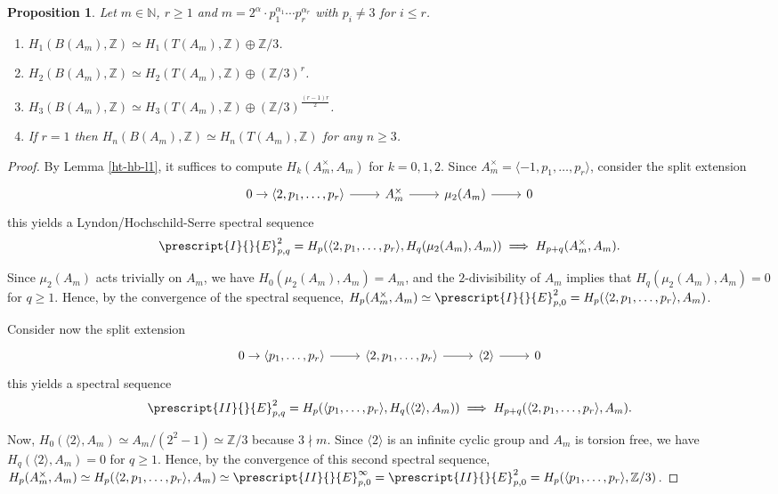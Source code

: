 \documentclass[11pt]{amsart}
\theoremstyle{definition}
\theoremstyle{plain}
\newtheorem{prp}[ntn]{Proposition}
\numberwithin{equation}{section}
\newcommand{\N}{\mathbb{N}}
\newcommand{\z}{\mathbb{Z}}
\newcommand{\lan}{\langle}
\newcommand{\ran}{\rangle}
\begin{document}
\begin{prp}\label{prp-hb-ht-am}
    Let $m\in\N$, $r\geq 1$ and $m=2^\alpha\cdot p_1^{\alpha_1}\cdots p_r^{\alpha_r}$ with $p_i\neq 3$ for $i\leq r$.
    \begin{enumerate}
        \item $H_1(B(A_m),\z)\simeq H_1(T(A_m),\z)\oplus \z/3$.
        \item $H_2(B(A_m),\z)\simeq H_2(T(A_m),\z)\oplus(\z/3)^r$.
        \item $H_3(B(A_m),\z)\simeq H_3(T(A_m),\z)\oplus(\z/3)^{\frac{(r-1)r}{2}}$.
        \item If $r=1$ then $H_n(B(A_m),\z)\simeq H_n(T(A_m),\z)$ for any $n\geq 3$.
    \end{enumerate}
\end{prp}
\begin{proof}
    By Lemma \ref{ht-hb-l1}, it suffices to compute $H_{k}(A_m^\times,A_m)$ for $k=0,1,2$. Since $A_m^\times=\lan-1,p_1,\dots,p_r\ran$, consider the split extension
    \[
        \begin{tikzcd}
            0\to \lan 2,p_1,\dots,p_r\ran\ar[r] & A_m^\times \ar[r] & \mu_2(A_m)\ar[r] & 0 
        \end{tikzcd}
    \]
    this yields a Lyndon/Hochschild-Serre spectral sequence
    \[
        \prescript{I}{}{E}^2_{p,q}=H_p(\lan 2,p_1,\dots,p_r\ran,H_q(\mu_2(A_m),A_m))\implies H_{p+q}(A_m^\times,A_m).
    \]
    
    Since $\mu_2(A_m)$ acts trivially on $A_m$, we have $H_0(\mu_2(A_m),A_m)=A_m$, and the $2$-divisibility of $A_m$ implies that $H_q(\mu_2(A_m),A_m)=0$ for $q\geq 1$. Hence, by the convergence of the spectral sequence, $H_p(A_m^\times,A_m)\simeq\prescript{I}{}{E}^2_{p,0}=H_p(\lan 2,p_1,\dots,p_r\ran,A_m)$.

    Consider now the split extension
    \[
        \begin{tikzcd}
            0\to \lan p_1,\dots,p_r\ran\ar[r] & \lan2,p_1,\dots,p_r\ran \ar[r] & \lan 2\ran\ar[r] & 0 
        \end{tikzcd}
    \]
    this yields a spectral sequence
    \[
        \prescript{II}{}{E}^2_{p,q}=H_p(\lan p_1,\dots,p_r\ran,H_q(\lan 2\ran,A_m))\implies H_{p+q}(\lan2,p_1,\dots,p_r\ran,A_m).
    \]
    
    Now, $H_0(\lan 2\ran,A_m)\simeq A_m/(2^2-1)\simeq\z/3$ because $3\nmid m$. Since $\lan 2\ran$ is an infinite cyclic group and $A_m$ is torsion free, we have $H_q(\lan 2\ran,A_m)=0$ for $q\geq 1$. Hence, by the convergence of this second spectral sequence, $H_p(A_m^\times,A_m)\simeq H_p(\lan 2,p_1,\dots,p_r\ran,A_m)\simeq\prescript{II}{}{E}^\infty_{p,0}=\prescript{II}{}{E}^2_{p,0}=H_p(\lan p_1,\dots,p_r\ran,\z/3)$.
    

\end{proof}
\end{document}
